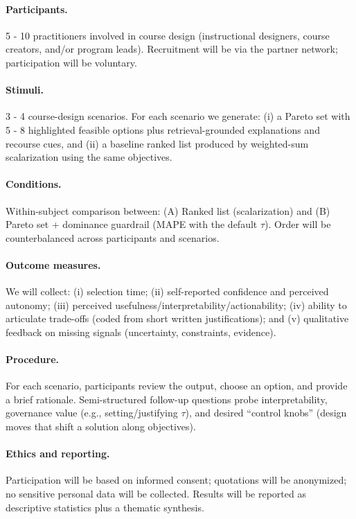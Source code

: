 \documentclass{article}
\newcommand{\MAPE}{\textsc{MAPE}\xspace}
\begin{document}
\paragraph{Participants.} 5 - 10 practitioners involved in course design (instructional designers, course creators, and/or program leads). Recruitment will be via the partner network; participation will be voluntary.

\paragraph{Stimuli.} 3 - 4 course-design scenarios. For each scenario we generate: (i) a Pareto set with 5 - 8 highlighted feasible options plus retrieval-grounded explanations and recourse cues, and (ii) a baseline ranked list produced by weighted-sum scalarization using the same objectives.

\paragraph{Conditions.} Within-subject comparison between:
(A) {Ranked list (scalarization)} and
(B) {Pareto set + dominance guardrail} (\MAPE with the default $\tau$).
Order will be counterbalanced across participants and scenarios.

\paragraph{Outcome measures.} We will collect:
(i) selection time; (ii) self-reported confidence and perceived autonomy; (iii) perceived usefulness/interpretability/actionability; (iv) ability to articulate trade-offs (coded from short written justifications); and (v) qualitative feedback on missing signals (uncertainty, constraints, evidence).

\paragraph{Procedure.} For each scenario, participants review the output, choose an option, and provide a brief rationale. Semi-structured follow-up questions probe interpretability, governance value (e.g., setting/justifying $\tau$), and desired ``control knobs'' (design moves that shift a solution along objectives).

\paragraph{Ethics and reporting.} Participation will be based on informed consent; quotations will be anonymized; no sensitive personal data will be collected. Results will be reported as descriptive statistics plus a thematic synthesis.
\end{document}
